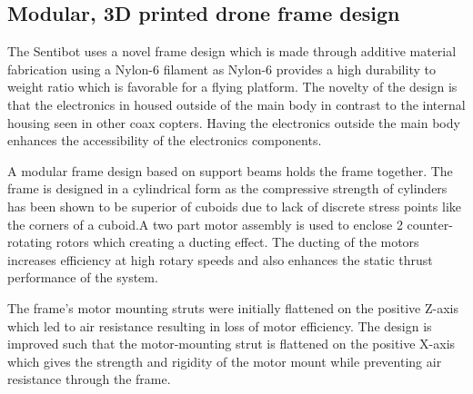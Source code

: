 \documentclass[12pt]{article}
\begin{document}
\subsection{Modular, 3D printed drone frame design}

The Sentibot uses a novel frame design which is made through additive material fabrication using a Nylon-6 filament as Nylon-6 provides a high durability to weight ratio which is favorable for a flying platform\cite{3Dprinting}. The novelty of the design is that the electronics in housed outside of the main body in contrast to the internal housing seen in other coax copters\cite{SFV}. Having the electronics outside the main body enhances the accessibility of the electronics components. 

A modular frame design based on support beams holds the frame together. The frame is designed in a cylindrical form as the compressive strength of cylinders has been shown to be superior of cuboids due to lack of discrete stress points like the corners of a cuboid\cite{cylinderstrength}.A two part motor assembly is used to enclose 2 counter-rotating rotors which creating a ducting effect. The ducting of the motors increases efficiency at high rotary speeds and also enhances the static thrust performance of the system\cite{ductedfan}.

The frame's motor mounting struts were initially flattened on the positive Z-axis which led to air resistance resulting in loss of motor efficiency. The design is improved such that the motor-mounting strut is flattened on the positive X-axis which gives the strength and rigidity of the motor mount while preventing air resistance through the frame.
\end{document}
